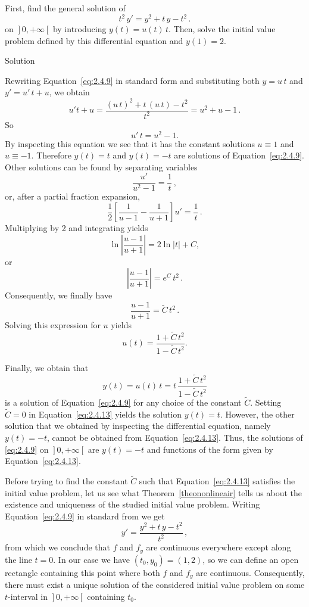 \begin{example}
First, find the general solution of 
\begin{equation} \label{eq:2.4.9}
t^2\,y'=y^2+t\,y-t^2\,.
\end{equation}
on $\left.\right]0,+\infty\left[\right.$ by introducing $y(t)=u(t)\,t$. Then, solve the initial value problem defined by this differential equation and $y(1)=2$. 

Solution 

Rewriting Equation~\eqref{eq:2.4.9} in standard form and substituting both $y=u\,t$ and $y'=u'\,t+u$, we obtain
$$
u't+u =\dfrac{ (u\,t)^2+t\,(u\,t)-t^2}{t^2}
= u^2+u-1\,.
$$
So
\begin{equation} \label{eq:2.4.11}
u'\,t=u^2-1.
\end{equation}
By inspecting this equation we see that it has the constant solutions $u\equiv1$ and $u\equiv-1$. Therefore $y(t)=t$ and $y(t)=-t$ are solutions of Equation~\eqref{eq:2.4.9}. Other solutions can be found by  separating variables
$$
\dfrac{u'}{u^2-1}=\dfrac{1}{t}\,,
$$
or, after a partial fraction expansion,
$$
\dfrac{1}{2}\left[\dfrac{1}{u-1}-\dfrac{1}{u+1}\right]u'=\dfrac{1}{t}\,.
$$
 Multiplying by 2 and integrating yields
$$
\ln\left|\dfrac{u-1}{u+1}\right| =2 \ln |t|+C,
$$
 or
$$
\left|\dfrac{u-1}{u+1}\right|=e^C\,t^2\,.
$$
Consequently, we finally have
\begin{equation} \label{eq:2.4.12}
\dfrac{u-1}{u+1}=\widetilde{C}\,t^2\,.
\end{equation}
 Solving this expression for $u$ yields
$$
u(t) =\dfrac{1+\widetilde{C}\,t^2}{1-\widetilde{C}\,t^2}.
$$

Finally, we obtain that 
\begin{equation} \label{eq:2.4.13}
y(t)=u(t)\,t=t\,\dfrac{1+\widetilde{C}\,t^2}{1-\widetilde{C}\,t^2}
\end{equation}
is a solution of Equation~\eqref{eq:2.4.9} for any choice of the constant $\widetilde{C}$. Setting $\widetilde{C}=0$ in Equation~\eqref{eq:2.4.13} yields the solution $y(t)=t$. However, the other solution that we obtained by inspecting the differential equation, namely $y(t)=-t$, cannot be obtained from Equation~\eqref{eq:2.4.13}. Thus, the solutions of \eqref{eq:2.4.9} on $\left.\right]0,+\infty\left[\right.$ are $y(t)=-t$ and functions of the form given by Equation~\eqref{eq:2.4.13}.

Before trying to find the constant $\widetilde{C}$ such that Equation~\eqref{eq:2.4.13} satisfies the initial value problem, let us see what Theorem~\ref{theononlineair} tells us about the existence and uniqueness of the studied initial value problem. Writing Equation~\eqref{eq:2.4.9} in standard from we get
$$
y'=\dfrac{y^2+t\,y-t^2}{t^2}\,,
$$
from which we conclude that $f$ and $f_y$ are continuous everywhere except along the line $t=0$. In our case we have $(t_0,y_0)=(1,2)$, so we can define an open rectangle containing this point where  both $f$ and $f_y$ are continuous. Consequently, there must exist a unique solution of the considered initial value problem on some $t$-interval in $\left.\right]0,+\infty\left[\right.$ containing $t_0$. 



\end{example}
